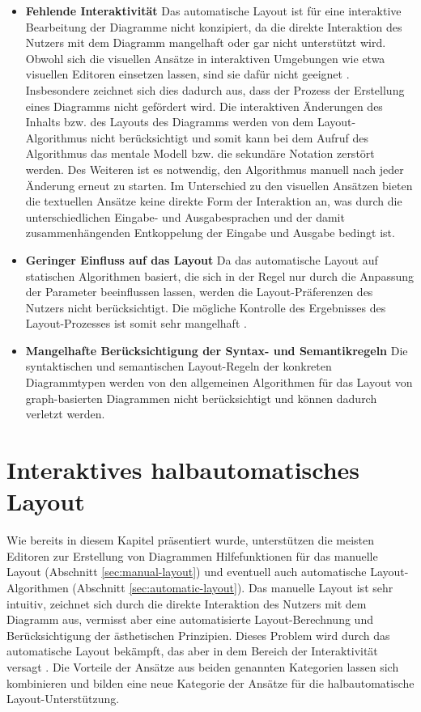 \begin{itemize}
    \item \textbf{Fehlende Interaktivität} Das automatische Layout ist für eine interaktive Bearbeitung der Diagramme nicht konzipiert, da die direkte Interaktion des Nutzers mit dem Diagramm mangelhaft oder gar nicht unterstützt wird. Obwohl sich die visuellen Ansätze in interaktiven Umgebungen wie etwa visuellen Editoren einsetzen lassen, sind sie dafür nicht geeignet \cite[S.22ff]{Maier12A-Pattern-based} \cite[S.4]{DwyerMarriott08Interactive}. Insbesondere zeichnet sich dies dadurch aus, dass der Prozess der Erstellung eines Diagramms nicht gefördert wird. Die interaktiven Änderungen des Inhalts bzw. des Layouts des Diagramms werden von dem Layout-Algorithmus nicht berücksichtigt und somit kann bei dem Aufruf des Algorithmus das mentale Modell \cite{Eiglsperger04Automatic} bzw. die sekundäre Notation \cite{SeyboldGlinz03An-Effective} zerstört werden. Des Weiteren ist es notwendig, den Algorithmus manuell nach jeder Änderung erneut zu starten. Im Unterschied zu den visuellen Ansätzen bieten die textuellen Ansätze keine direkte Form der Interaktion an, was durch die unterschiedlichen Eingabe- und Ausgabesprachen und der damit zusammenhängenden Entkoppelung der Eingabe und Ausgabe bedingt ist.
    \item \textbf{Geringer Einfluss auf das Layout} Da das automatische Layout auf statischen Algorithmen basiert, die sich in der Regel nur durch die Anpassung der Parameter beeinflussen lassen, werden die Layout-Präferenzen des Nutzers nicht berücksichtigt. Die mögliche Kontrolle des Ergebnisses des Layout-Prozesses ist somit sehr mangelhaft \cite[S.382]{GladischSchumann14Semi-Automatic}.
    \item \textbf{Mangelhafte Berücksichtigung der Syntax- und Semantikregeln} Die syntaktischen und semantischen Layout-Regeln der konkreten Diagrammtypen werden von den allgemeinen Algorithmen für das Layout von graph-basierten Diagrammen nicht berücksichtigt und können dadurch verletzt werden.
\end{itemize}

\section{Interaktives halbautomatisches Layout}
\label{sec:interactive-semi-automatic-layout}

Wie bereits in diesem Kapitel präsentiert wurde, unterstützen die meisten Editoren zur Erstellung von Diagrammen Hilfefunktionen für das manuelle Layout (Abschnitt \ref{sec:manual-layout}) und eventuell auch automatische Layout-Algorithmen (Abschnitt \ref{sec:automatic-layout}). Das manuelle Layout ist sehr intuitiv, zeichnet sich durch die direkte Interaktion des Nutzers mit dem Diagramm aus, vermisst aber eine automatisierte Layout-Berechnung und Berücksichtigung der ästhetischen Prinzipien. Dieses Problem wird durch das automatische Layout bekämpft, das aber in dem Bereich der Interaktivität versagt \cite{GladischSchumann14Semi-Automatic}. Die Vorteile der Ansätze aus beiden genannten Kategorien lassen sich kombinieren und bilden eine neue Kategorie der Ansätze für die halbautomatische Layout-Unterstützung.


